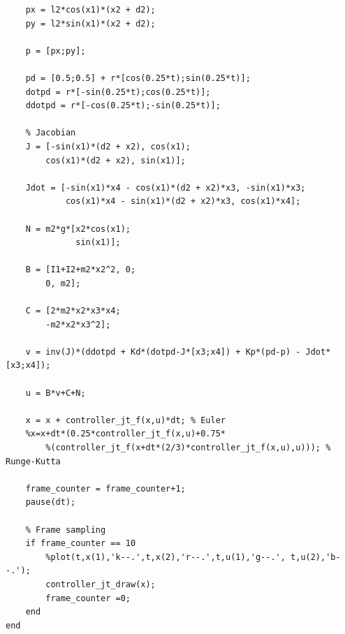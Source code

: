 \documentclass{article}
\begin{document}
\begin{itemize}
\begin{tcolorbox}
\begin{scriptsize}
\begin{verbatim}
    px = l2*cos(x1)*(x2 + d2);
    py = l2*sin(x1)*(x2 + d2);
    
    p = [px;py];

    pd = [0.5;0.5] + r*[cos(0.25*t);sin(0.25*t)];
    dotpd = r*[-sin(0.25*t);cos(0.25*t)];
    ddotpd = r*[-cos(0.25*t);-sin(0.25*t)];

    % Jacobian
    J = [-sin(x1)*(d2 + x2), cos(x1);
        cos(x1)*(d2 + x2), sin(x1)];

    Jdot = [-sin(x1)*x4 - cos(x1)*(d2 + x2)*x3, -sin(x1)*x3;
            cos(x1)*x4 - sin(x1)*(d2 + x2)*x3, cos(x1)*x4];

    N = m2*g*[x2*cos(x1);
              sin(x1)];

    B = [I1+I2+m2*x2^2, 0;
        0, m2];

    C = [2*m2*x2*x3*x4;
        -m2*x2*x3^2];

    v = inv(J)*(ddotpd + Kd*(dotpd-J*[x3;x4]) + Kp*(pd-p) - Jdot*[x3;x4]);
    
    u = B*v+C+N;

    x = x + controller_jt_f(x,u)*dt; % Euler
    %x=x+dt*(0.25*controller_jt_f(x,u)+0.75*
    	%(controller_jt_f(x+dt*(2/3)*controller_jt_f(x,u),u))); % Runge-Kutta
    
    frame_counter = frame_counter+1;
    pause(dt);

    % Frame sampling
    if frame_counter == 10
        %plot(t,x(1),'k--.',t,x(2),'r--.',t,u(1),'g--.', t,u(2),'b--.');
        controller_jt_draw(x);
        frame_counter =0;
    end
end 

\end{verbatim}
\end{scriptsize}
\end{tcolorbox}





\end{itemize}
\end{document}
